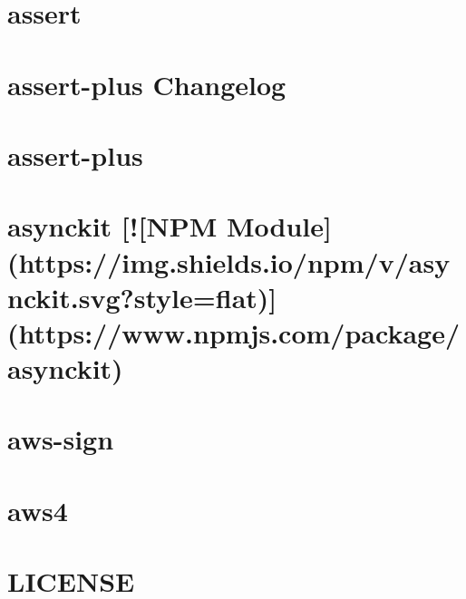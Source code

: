 \documentclass[twoside]{book}
\newcommand{\+}{\discretionary{\mbox{\scriptsize$\hookleftarrow$}}{}{}}
\begin{document}
\chapter{assert}
\label{md_dsmacc_examples_DRmerge_node_modules_assert_README}

\chapter{assert-\/plus Changelog}
\label{md_dsmacc_examples_DRmerge_node_modules_assert-plus_CHANGES}

\chapter{assert-\/plus}
\label{md_dsmacc_examples_DRmerge_node_modules_assert-plus_README}

\chapter{asynckit \mbox{[}!\mbox{[}N\+PM Module\mbox{]}(https\+://img.shields.\+io/npm/v/asynckit.svg?style=flat)\mbox{]}(https\+://www.npmjs.\+com/package/asynckit)}
\label{md_dsmacc_examples_DRmerge_node_modules_asynckit_README}

\chapter{aws-\/sign}
\label{md_dsmacc_examples_DRmerge_node_modules_aws-sign2_README}

\chapter{aws4}
\label{md_dsmacc_examples_DRmerge_node_modules_aws4_README}

\chapter{L\+I\+C\+E\+N\+SE}
\label{md_dsmacc_examples_DRmerge_node_modules_balanced-match_LICENSE}

\end{document}
